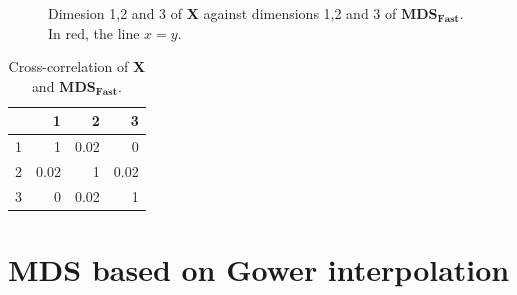 \documentclass[11pt]{report}
\begin{document}
\begin{figure}[ht]
    \centering
    \caption{Dimesion 1,2 and 3 of \textbf{X} against dimensions 1,2 and 3 of  $\mathbf{MDS_{Fast}}$. \newline
            In red, the line $x=y$.}%
    \label{fast_example}%
\end{figure}


\begin{table}[ht]
\centering
\begin{tabular}{rrrr}
  \hline
 & 1 & 2 & 3 \\ 
  \hline
  1 & 1 & 0.02 & 0 \\ 
  2 & 0.02 & 1 & 0.02 \\ 
  3 & 0 & 0.02 & 1 \\ 
   \hline
\end{tabular}
\caption{Cross-correlation of \textbf{X} and $\mathbf{MDS_{Fast}}$.} 
\label{corr_fast}
\end{table}

\section{MDS based on Gower interpolation}
\end{document}
